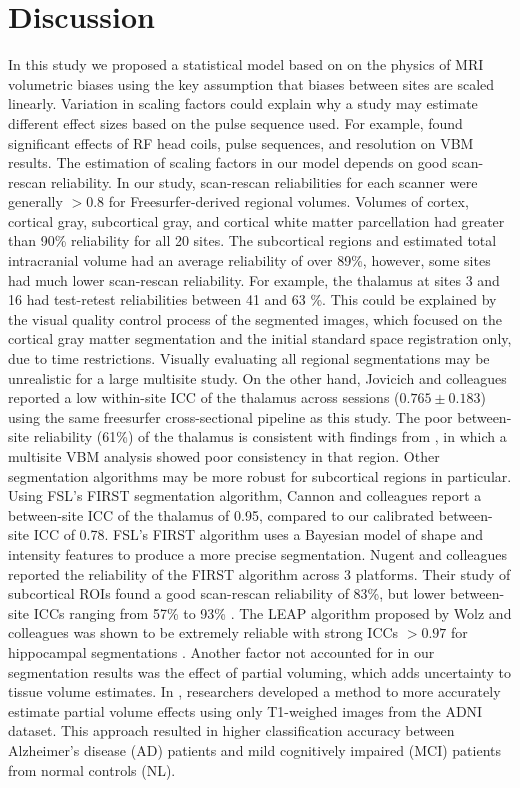 \documentclass{article}
\begin{document}
\section{Discussion} %
In this study we proposed a statistical model based on on the physics of MRI volumetric biases using the key assumption that biases between sites are scaled linearly. Variation in scaling factors could explain why a study may estimate different effect sizes based on the pulse sequence used. For example, \cite{streitburger2014impact} found significant effects of RF head coils, pulse sequences, and resolution on VBM results. The estimation of scaling factors in our model depends on good scan-rescan reliability. In our study, scan-rescan reliabilities for each scanner were generally $>0.8$ for Freesurfer-derived regional volumes. Volumes of cortex, cortical gray, subcortical gray, and cortical white matter parcellation had greater than 90\% reliability for all 20 sites. The subcortical regions and estimated total intracranial volume had an average reliability of over 89\%, however, some sites had much lower scan-rescan reliability. For example, the thalamus at sites 3 and 16 had test-retest reliabilities between 41 and 63 \%. This could be explained by the visual quality control process of the segmented images, which focused on the cortical gray matter segmentation and the initial standard space registration only, due to time restrictions. Visually evaluating all regional segmentations may be unrealistic for a large multisite study. On the other hand, Jovicich and colleagues \cite{jovicich2013brain} reported a low within-site ICC of the thalamus across sessions ($0.765 \pm 0.183$) using the same freesurfer cross-sectional pipeline as this study. The poor between-site reliability (61\%) of the thalamus is consistent with findings from \cite{schnack2010mapping}, in which a multisite VBM analysis showed poor consistency in that region. Other segmentation algorithms may be more robust for subcortical regions in particular. Using FSL's FIRST segmentation algorithm, Cannon and colleagues \cite{cannon2014} report a between-site ICC of the thalamus of 0.95, compared to our calibrated between-site ICC of 0.78. FSL's FIRST algorithm \cite{firstcitation} uses a Bayesian model of shape and intensity features to produce a more precise segmentation. Nugent and colleagues reported the reliability of the FIRST algorithm across 3 platforms. Their study of subcortical ROIs found a good scan-rescan reliability of 83\%, but lower between-site ICCs ranging from 57\% to 93\% \cite{firstreliability}. The LEAP algorithm proposed by Wolz and colleagues \cite{Wolz_2010} was shown to be extremely reliable with strong ICCs $>0.97$ for hippocampal segmentations \cite{Wolz_2014}. Another factor not accounted for in our segmentation results was the effect of partial voluming, which adds uncertainty to tissue volume estimates. In \cite{Roche_2014}, researchers developed a method to more accurately estimate partial volume effects using only T1-weighed images from the ADNI dataset. This approach resulted in higher classification accuracy between Alzheimer's disease (AD) patients and mild cognitively impaired (MCI) patients from normal controls (NL). 
\end{document}
